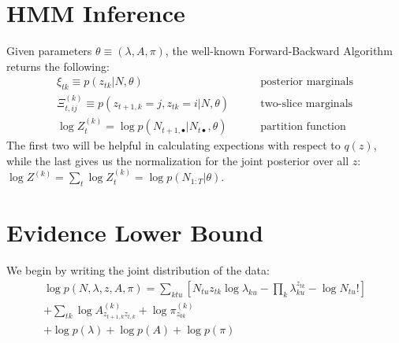 \documentclass[11pt]{article}
\begin{document}
\section{HMM Inference}
Given parameters $\theta \equiv (\lambda, A, \pi)$, the well-known Forward-Backward Algorithm returns the following:
\begin{align}
    \xi_{tk} \equiv p(z_{tk}|N, \theta) \qquad &\text{posterior marginals}\\
    \Xi^{(k)}_{t, ij} \equiv p(z_{t+1,k} = j, z_{tk} = i|N, \theta) \qquad &\text{two-slice marginals}\\
    \log Z_t^{(k)} = \log p(N_{t+1, \bullet}|N_{t\bullet}, \theta) \qquad &\text{partition function}
\end{align}
The first two will be helpful in calculating expections with respect to $q(z)$, while the last gives us the normalization for the joint posterior over all $z$: $\log Z^{({k})} = \sum_t \log Z_t^{(k)} = \log p(N_{1:T}|\theta)$. 

\section{Evidence Lower Bound}
We begin by writing the joint distribution of the data:
\begin{multline}
    \log p(N, \lambda, z, A,\pi) = \sum_{ktu}\left[ N_{tu} z_{tk} \log \lambda_{ku} - \prod_k \lambda_{ku}^{z_{tk}} - \log N_{tu}!\right] \\
    + \sum_{tk} \log A^{(k)}_{z_{t+1, k} z_{t, k}} + \log \pi^{(k)}_{z_{0k}} \\
    + \log p(\lambda) + \log p(A) + \log p(\pi) 
\end{multline}
\end{document}
